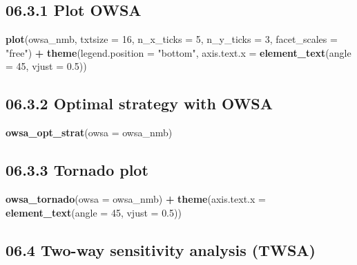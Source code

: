 \documentclass[]{article}
\newenvironment{Shaded}{\begin{snugshade}}{\end{snugshade}}
\newcommand{\KeywordTok}[1]{\textcolor[rgb]{0.13,0.29,0.53}{\textbf{#1}}}
\newcommand{\DataTypeTok}[1]{\textcolor[rgb]{0.13,0.29,0.53}{#1}}
\newcommand{\DecValTok}[1]{\textcolor[rgb]{0.00,0.00,0.81}{#1}}
\newcommand{\FloatTok}[1]{\textcolor[rgb]{0.00,0.00,0.81}{#1}}
\newcommand{\StringTok}[1]{\textcolor[rgb]{0.31,0.60,0.02}{#1}}
\newcommand{\OperatorTok}[1]{\textcolor[rgb]{0.81,0.36,0.00}{\textbf{#1}}}
\newcommand{\NormalTok}[1]{#1}
\begin{document}
\subsection{06.3.1 Plot OWSA}\label{plot-owsa}

\begin{Shaded}
\begin{Highlighting}[]
\KeywordTok{plot}\NormalTok{(owsa_nmb, }\DataTypeTok{txtsize =} \DecValTok{16}\NormalTok{, }\DataTypeTok{n_x_ticks =} \DecValTok{5}\NormalTok{, }\DataTypeTok{n_y_ticks =} \DecValTok{3}\NormalTok{,}
     \DataTypeTok{facet_scales =} \StringTok{"free"}\NormalTok{) }\OperatorTok{+}
\StringTok{     }\KeywordTok{theme}\NormalTok{(}\DataTypeTok{legend.position =} \StringTok{"bottom"}\NormalTok{, }
           \DataTypeTok{axis.text.x =} \KeywordTok{element_text}\NormalTok{(}\DataTypeTok{angle =} \DecValTok{45}\NormalTok{, }\DataTypeTok{vjust =} \FloatTok{0.5}\NormalTok{))}
\end{Highlighting}
\end{Shaded}

\subsection{06.3.2 Optimal strategy with
OWSA}\label{optimal-strategy-with-owsa}

\begin{Shaded}
\begin{Highlighting}[]
\KeywordTok{owsa_opt_strat}\NormalTok{(}\DataTypeTok{owsa =}\NormalTok{ owsa_nmb)}
\end{Highlighting}
\end{Shaded}

\subsection{06.3.3 Tornado plot}\label{tornado-plot}

\begin{Shaded}
\begin{Highlighting}[]
\KeywordTok{owsa_tornado}\NormalTok{(}\DataTypeTok{owsa =}\NormalTok{ owsa_nmb) }\OperatorTok{+}
\StringTok{  }\KeywordTok{theme}\NormalTok{(}\DataTypeTok{axis.text.x =} \KeywordTok{element_text}\NormalTok{(}\DataTypeTok{angle =} \DecValTok{45}\NormalTok{, }\DataTypeTok{vjust =} \FloatTok{0.5}\NormalTok{))}
\end{Highlighting}
\end{Shaded}

\subsection{06.4 Two-way sensitivity analysis
(TWSA)}\label{two-way-sensitivity-analysis-twsa}
\end{document}
